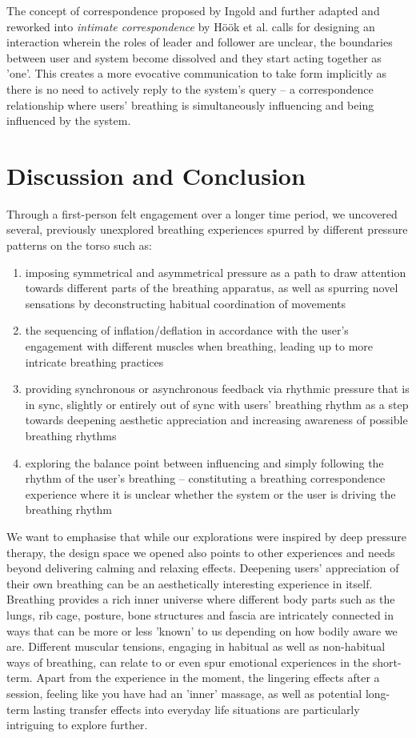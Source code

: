 The concept of correspondence proposed by Ingold \cite{ingold_being_2011} and further adapted and reworked into \textit{intimate correspondence} by Höök et al. \cite{hook_somaesthetic_2016} calls for designing an interaction wherein the roles of leader and follower are unclear, the boundaries between user and system become dissolved and they start acting together as 'one'. This creates a more evocative communication to take form implicitly as there is no need to actively reply to the system's query -- a correspondence relationship where users' breathing is simultaneously influencing and being influenced by the system. 


\section{Discussion and Conclusion}
Through a first-person felt engagement over a longer time period, we uncovered several, previously unexplored breathing experiences spurred by different pressure patterns on the torso such as: 
\begin{enumerate}
    \item imposing symmetrical and asymmetrical pressure as a path to draw attention towards different  parts of the breathing apparatus, as well as spurring novel sensations by deconstructing habitual coordination of movements 
    \item the sequencing of inflation/deflation in accordance with the user's engagement with different muscles when breathing, leading up to more intricate breathing practices
    \item providing synchronous or asynchronous feedback via rhythmic pressure that is in sync, slightly or entirely out of sync with users' breathing rhythm as a step towards deepening aesthetic appreciation and increasing awareness of possible breathing rhythms
    \item exploring the balance point between influencing and simply following the rhythm of the user’s breathing -- constituting a breathing correspondence experience where it is unclear whether the system or the user is driving the breathing rhythm 
\end{enumerate}

We want to emphasise that while our explorations were inspired by deep pressure therapy, the design space we opened also points to other experiences and needs beyond delivering calming and relaxing effects. Deepening users' appreciation of their own breathing can be an aesthetically interesting experience in itself. Breathing provides a rich inner universe where different body parts such as the lungs, rib cage, posture, bone structures and fascia are intricately connected in ways that can be more or less 'known' to us depending on how bodily aware we are. Different muscular tensions, engaging in habitual as well as non-habitual ways of breathing, can relate to or even spur emotional experiences in the short-term. Apart from the experience in the moment, the lingering effects after a session, feeling like you have had an 'inner' massage, as well as potential long-term lasting transfer effects into everyday life situations are particularly intriguing to explore further. 
 
